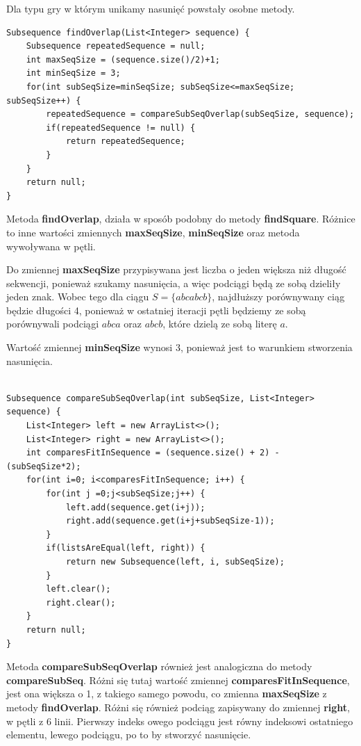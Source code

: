 \documentclass[document]{xmgr}
\begin{document}
Dla typu gry w którym unikamy nasunięć powstały osobne metody.

\begin{lstlisting}[frame=single]
Subsequence findOverlap(List<Integer> sequence) {
	Subsequence repeatedSequence = null;
	int maxSeqSize = (sequence.size()/2)+1;
	int minSeqSize = 3;
	for(int subSeqSize=minSeqSize; subSeqSize<=maxSeqSize; subSeqSize++) {
		repeatedSequence = compareSubSeqOverlap(subSeqSize, sequence);
		if(repeatedSequence != null) {
			return repeatedSequence;
		}
	}
	return null;
}
\end{lstlisting}

Metoda \textbf{findOverlap}, działa w sposób podobny do metody \textbf{findSquare}. Różnice to inne wartości zmiennych \textbf{maxSeqSize}, \textbf{minSeqSize} oraz metoda wywoływana w pętli.

Do zmiennej \textbf{maxSeqSize} przypisywana jest liczba o jeden większa niż długość sekwencji, ponieważ szukamy nasunięcia, a więc podciągi będą ze sobą dzieliły jeden znak. Wobec tego dla ciągu $S = \{abcabcb\}$, najdłuższy porównywany ciąg będzie długości 4, ponieważ w ostatniej iteracji pętli będziemy ze sobą porównywali podciągi $abca$ oraz $abcb$, które dzielą ze sobą literę $a$.

Wartość zmiennej \textbf{minSeqSize} wynosi 3, ponieważ jest to warunkiem stworzenia nasunięcia.

\begin{lstlisting}[frame=single]

Subsequence compareSubSeqOverlap(int subSeqSize, List<Integer> sequence) {
	List<Integer> left = new ArrayList<>();
	List<Integer> right = new ArrayList<>();
	int comparesFitInSequence = (sequence.size() + 2) - (subSeqSize*2);
	for(int i=0; i<comparesFitInSequence; i++) {
		for(int j =0;j<subSeqSize;j++) {
			left.add(sequence.get(i+j));
			right.add(sequence.get(i+j+subSeqSize-1));
		}
		if(listsAreEqual(left, right)) {
			return new Subsequence(left, i, subSeqSize);
		}
		left.clear();
		right.clear();
	}
	return null;
} 
\end{lstlisting}

Metoda \textbf{compareSubSeqOverlap} również jest analogiczna do metody \textbf{compareSubSeq}. Różni się tutaj wartość zmiennej \textbf{comparesFitInSequence}, jest ona większa o 1, z takiego samego powodu, co zmienna \textbf{maxSeqSize} z metody \textbf{findOverlap}. Różni się również podciąg zapisywany do zmiennej \textbf{right}, w pętli z 6 linii. Pierwszy indeks owego podciągu jest równy indeksowi ostatniego elementu, lewego podciągu, po to by stworzyć nasunięcie.
\end{document}
